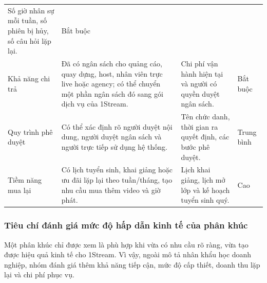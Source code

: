 \begin{table}[H]
\begin{tabularx}{\linewidth}{@{}L{2.3cm}Y Y L{2.1cm}@{}}
        Số giờ nhân sự mỗi tuần, số phiên bị hủy, số câu hỏi lặp lại. & Bắt buộc \\
        Khả năng chi trả & Đã có ngân sách cho quảng cáo, quay dựng, host,
        nhân viên trực live hoặc agency; có thể chuyển một phần ngân sách đó sang
        gói dịch vụ của 1Stream. &
        Chi phí vận hành hiện tại và người có quyền duyệt ngân sách. & Bắt buộc \\
        Quy trình phê duyệt & Có thể xác định rõ người duyệt nội dung, người duyệt
        ngân sách và người trực tiếp sử dụng hệ thống. &
        Tên chức danh, thời gian ra quyết định, các bước phê duyệt. & Trung bình \\
        Tiềm năng mua lại & Có lịch tuyển sinh, khai giảng hoặc ưu đãi lặp lại
        theo tuần/tháng, tạo nhu cầu mua thêm video và giờ phát. &
        Lịch khai giảng, lịch mở lớp và kế hoạch tuyển sinh quý. & Cao \\ \bottomrule
    \end{tabularx}
\end{table}

\subsubsection{Tiêu chí đánh giá mức độ hấp dẫn kinh tế của phân khúc}

Một phân khúc chỉ được xem là phù hợp khi vừa có nhu cầu rõ ràng, vừa tạo được
hiệu quả kinh tế cho 1Stream. Vì vậy, ngoài mô tả nhân khẩu học doanh nghiệp,
nhóm đánh giá thêm khả năng tiếp cận, mức độ cấp thiết, doanh thu lặp lại và chi
phí phục vụ.

